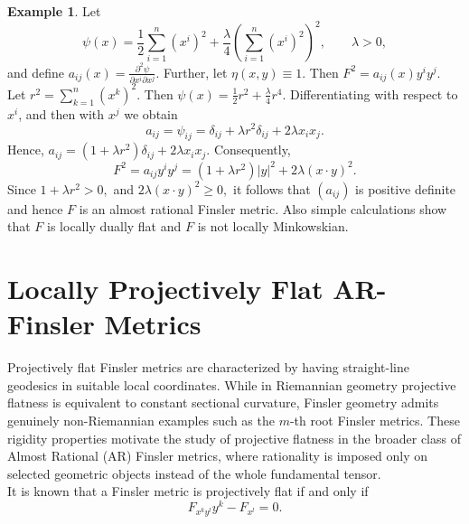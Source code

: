 \documentclass[12pt]{article}
\theoremstyle{definition}
\newtheorem{example}[theorem]{Example}
\begin{document}
							\begin{example}
								\textnormal{Let
									\begin{equation}
									\psi(x)=\frac12\sum_{i=1}^{n}(x^i)^2+\frac{\lambda}{4}\left(\sum_{i=1}^{n}(x^i)^2 \right)^2,\qquad \lambda>0,    
									\end{equation}
									and define $a_{ij}(x)=\frac{\partial^2\psi}{\partial x^i\partial x^j}.$ Further, let $\eta(x,y)\equiv 1.$ Then $F^2=a_{ij}(x)y^iy^j$.\\
									Let $r^2=\sum_{k=1}^{n}(x^k)^2.$ Then $\psi(x)=\frac12r^2+\frac{\lambda}{4}r^4.$
									Differentiating with respect to $x^i$, and then with $x^j$ we obtain
									\begin{equation}
									a_{ij}=\psi_{ij}=\delta_{ij}+\lambda r^2\delta_{ij}+2\lambda x_ix_j.    
									\end{equation}
									Hence, $a_{ij}=(1+\lambda r^2)\delta_{ij}+2\lambda x_ix_j.$ Consequently, 
									\begin{equation}
									F^2=a_{ij}y^iy^j=(1+\lambda r^2)|y|^2+2\lambda(x\cdot y)^2.   
									\end{equation}
									Since $1+\lambda r^2>0,$ and $2\lambda(x\cdot y)^2\ge 0,$ it follows that  $(a_{ij})$ is positive definite and hence $F$ is an almost rational Finsler metric. Also simple calculations show that $F$ is locally dually flat and $F$ is not locally Minkowskian.}
									
									
								\end{example}
								
								\section{Locally Projectively Flat AR-Finsler Metrics} 
								
								Projectively flat Finsler metrics are characterized by having straight-line geodesics in suitable local coordinates. While in Riemannian geometry projective flatness is equivalent to constant sectional curvature, Finsler geometry admits genuinely non-Riemannian examples such as the $m$-th root Finsler metrics. These rigidity properties motivate the study of projective flatness in the broader class of Almost Rational (AR) Finsler metrics, where rationality is imposed only on selected geometric objects instead of the whole fundamental tensor.\\
								It is known \cite{hamel1903} that a Finsler metric is projectively flat if and only if
								\begin{equation}\label{2.3e}
								F_{x^k y^l} y^k - F_{x^l} = 0.
								\end{equation}
								
\end{document}
